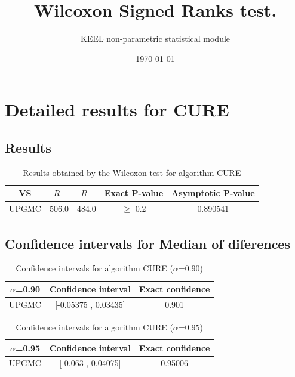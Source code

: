 \documentclass[a4paper,10pt]{article}
\title{Wilcoxon Signed Ranks test.}
\date{\today}
\author{KEEL non-parametric statistical module}
\begin{document}
\pagestyle{empty}
\maketitle
\thispagestyle{empty}



\section{Detailed results for CURE}


\subsection{Results}

\begin{table}[!htp]
\centering\small
\begin{tabular}{
|c|c|c|c|c|}
\hline
 VS & $R^{+}$ & $R^{-}$ & Exact P-value & Asymptotic P-value \\ \hline 
UPGMC & 506.0 & 484.0 & $\geq$ 0.2 & 0.890541\\ \hline 

\end{tabular}
\caption{Results obtained by the Wilcoxon test for algorithm CURE}
\end{table}

\subsection{Confidence intervals for Median of diferences}

\begin{table}[!htp]
\centering\small
\begin{tabular}{
|c|c|c|}
\hline
 $\alpha$=0.90 & Confidence interval & Exact confidence \\ \hline 
UPGMC & [-0.05375 , 0.03435] & 0.901\\ \hline 

\end{tabular}
\caption{Confidence intervals for algorithm CURE ($\alpha$=0.90)}
\end{table}
\begin{table}[!htp]
\centering\small
\begin{tabular}{
|c|c|c|}
\hline
 $\alpha$=0.95 & Confidence interval & Exact confidence \\ \hline 
UPGMC & [-0.063 , 0.04075] & 0.95006\\ \hline 

\end{tabular}
\caption{Confidence intervals for algorithm CURE ($\alpha$=0.95)}
\end{table}
\end{document}
